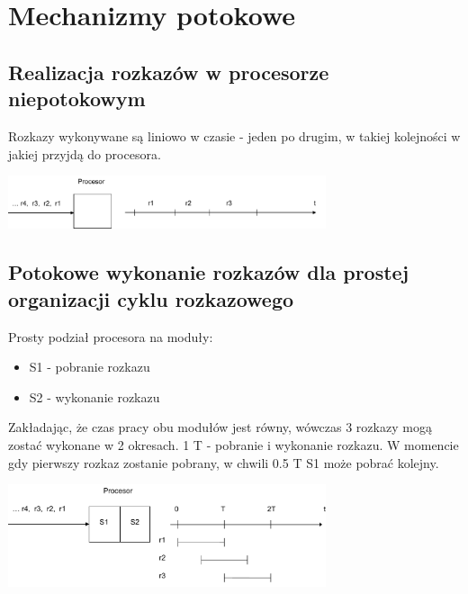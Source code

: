 \documentclass[a4paper,twoside]{article}
\begin{document}
\newpage
\section{Mechanizmy potokowe}
\subsection{Realizacja rozkazów w procesorze niepotokowym}
Rozkazy wykonywane są liniowo w czasie - jeden po drugim, w takiej kolejności w jakiej przyjdą do procesora.
\begin{center}
	\includegraphics[width=0.7\textwidth]{./images/potok01}
\end{center}
\subsection{Potokowe wykonanie rozkazów dla prostej organizacji cyklu rozkazowego}
Prosty podział procesora na moduły:
\begin{itemize}
	\item S1 - pobranie rozkazu
	\item S2 - wykonanie rozkazu
\end{itemize}
Zakładając, że czas pracy obu modułów jest równy, wówczas 3 rozkazy mogą zostać wykonane w 2 okresach. 1 T - pobranie i wykonanie rozkazu. W momencie gdy pierwszy rozkaz zostanie pobrany, w chwili 0.5 T S1 może pobrać kolejny.
\begin{center}
	\includegraphics[width=0.7\textwidth]{./images/potok02}
\end{center}
\end{document}
